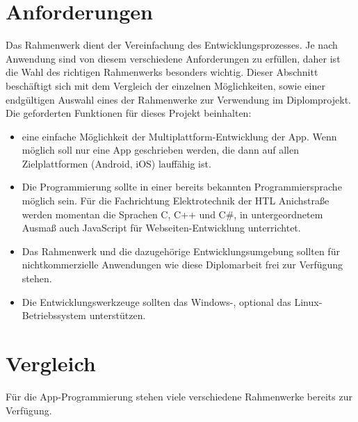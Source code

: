 \section{Anforderungen}
Das Rahmenwerk dient der Vereinfachung des Entwicklungsprozesses.
Je nach Anwendung sind von diesem verschiedene Anforderungen zu erfüllen, daher ist die Wahl des richtigen Rahmenwerks besonders wichtig.
Dieser Abschnitt beschäftigt sich mit dem Vergleich der einzelnen Möglichkeiten, sowie einer endgültigen Auswahl eines der Rahmenwerke zur Verwendung im Diplomprojekt.
Die geforderten Funktionen für dieses Projekt beinhalten:
\begin{itemize}
    \item eine einfache Möglichkeit der Multiplattform-Entwicklung der App. Wenn möglich soll nur eine App geschrieben werden, die dann auf allen Zielplattformen (Android, iOS) lauffähig ist.
    \item Die Programmierung sollte in einer bereits bekannten Programmiersprache möglich sein.
    Für die Fachrichtung Elektrotechnik der HTL Anichstraße werden momentan die Sprachen C, C++ und C\#, in untergeordnetem Ausmaß auch JavaScript für Webseiten-Entwicklung unterrichtet.
    \item Das Rahmenwerk und die dazugehörige Entwicklungsumgebung sollten für nichtkommerzielle Anwendungen wie diese Diplomarbeit frei zur Verfügung stehen.
    \item Die Entwicklungswerkzeuge sollten das Windows-, optional das Linux-Betriebs\-sys\-tem unterstützen.
\end{itemize}

\section{Vergleich}
Für die App-Programmierung stehen viele verschiedene Rahmenwerke bereits zur Verfügung.
